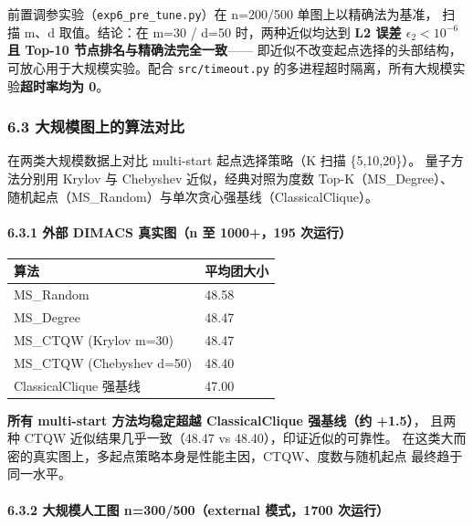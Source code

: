 \documentclass[
  11pt,
]{ctexart}
\newcounter{none} %
\begin{document}
前置调参实验（\texttt{exp6\_pre\_tune.py}）在 n=200/500
单图上以精确法为基准， 扫描 m、d 取值。结论：在 m=30 / d=50
时，两种近似均达到 \textbf{L2 误差 \(\epsilon_2 < 10^{-6}\) 且 Top-10
节点排名与精确法完全一致}------
即近似不改变起点选择的头部结构，可放心用于大规模实验。配合
\texttt{src/timeout.py}
的多进程超时隔离，所有大规模实验\textbf{超时率均为 0}。

\subsubsection{6.3
大规模图上的算法对比}\label{ux5927ux89c4ux6a21ux56feux4e0aux7684ux7b97ux6cd5ux5bf9ux6bd4}

在两类大规模数据上对比 multi-start 起点选择策略（K 扫描 \{5,10,20\}）。
量子方法分别用 Krylov 与 Chebyshev 近似，经典对照为度数
Top-K（MS\_Degree）、
随机起点（MS\_Random）与单次贪心强基线（ClassicalClique）。

\paragraph{6.3.1 外部 DIMACS 真实图（n 至 1000+，195
次运行）}\label{ux5916ux90e8-dimacs-ux771fux5b9eux56fen-ux81f3-1000195-ux6b21ux8fd0ux884c}

{\def\LTcaptype{none} %
\begin{longtable}[]{@{}ll@{}}
\toprule\noalign{}
算法 & 平均团大小 \\
\midrule\noalign{}
\endhead
\bottomrule\noalign{}
\endlastfoot
MS\_Random & 48.58 \\
MS\_Degree & 48.47 \\
MS\_CTQW (Krylov m=30) & 48.47 \\
MS\_CTQW (Chebyshev d=50) & 48.40 \\
ClassicalClique 强基线 & 47.00 \\
\end{longtable}
}

\textbf{所有 multi-start 方法均稳定超越 ClassicalClique 强基线（约
+1.5）}， 且两种 CTQW 近似结果几乎一致（48.47 vs
48.40），印证近似的可靠性。
在这类大而密的真实图上，多起点策略本身是性能主因，CTQW、度数与随机起点
最终趋于同一水平。

\paragraph{6.3.2 大规模人工图 n=300/500（external 模式，1700
次运行）}\label{ux5927ux89c4ux6a21ux4ebaux5de5ux56fe-n300500external-ux6a21ux5f0f1700-ux6b21ux8fd0ux884c}
\end{document}
